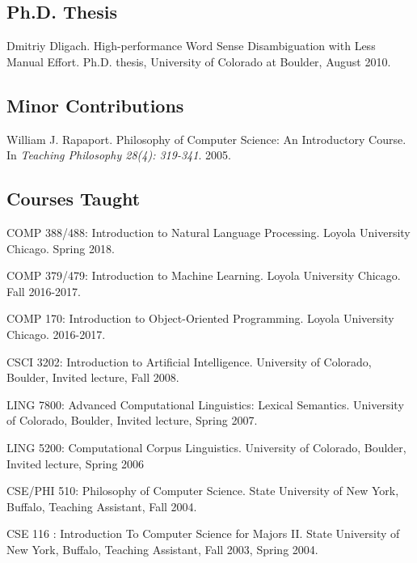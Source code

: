 \documentclass[letterpaper]{article}
\renewenvironment{itemize}{
  \begin{list}{}{
    \setlength{\leftmargin}{1.5em}
  }
}{
  \end{list}
}
\begin{document}
\subsection*{Ph.D. Thesis}
\begin{itemize}
\item Dmitriy Dligach. High-performance Word Sense Disambiguation with Less Manual Effort. Ph.D. thesis, University of Colorado at Boulder, August 2010.
\end{itemize}

\subsection*{Minor Contributions}
\begin{itemize}
\item William J. Rapaport. Philosophy of Computer Science: An Introductory Course. In \emph {Teaching Philosophy 28(4): 319-341}. 2005.
\end{itemize}

\subsection*{Courses Taught}

\begin{itemize}
\item COMP 388/488: Introduction to Natural Language Processing. Loyola University Chicago. Spring 2018.
\item COMP 379/479: Introduction to Machine Learning. Loyola University Chicago. Fall 2016-2017.
\item COMP 170: Introduction to Object-Oriented Programming. Loyola University Chicago. 2016-2017.
\item CSCI 3202: Introduction to Artificial Intelligence. University of Colorado, Boulder, Invited lecture, Fall 2008.
\item LING 7800: Advanced Computational Linguistics: Lexical Semantics. University of Colorado, Boulder, Invited lecture, Spring 2007.
\item LING 5200: Computational Corpus Linguistics. University of Colorado, Boulder, Invited lecture, Spring 2006
\item CSE/PHI 510: Philosophy of Computer Science. State University of New York, Buffalo, Teaching Assistant, Fall 2004.
\item CSE 116 : Introduction To Computer Science for Majors II. State University of New York, Buffalo, Teaching Assistant, Fall 2003, Spring 2004.
\end{itemize}
\end{document}
